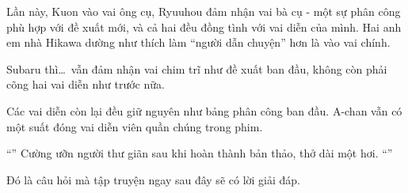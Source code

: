 \documentclass[../main.tex]{subfiles}
\begin{document}
Lần này, Kuon vào vai ông cụ, Ryuuhou đảm nhận vai bà cụ - một sự phân công phù hợp với đề xuất mới, và cả hai đều đồng tình với vai diễn của mình. Hai anh em nhà Hikawa dường như thích làm ``người dẫn chuyện'' hơn là vào vai chính.

Subaru thì\dots\ vẫn đảm nhận vai chim trĩ như đề xuất ban đầu, không còn phải cõng hai vai diễn như trước nữa.

Các vai diễn còn lại đều giữ nguyên như bảng phân công ban đầu. A-chan vẫn có một suất đóng vai diễn viên quần chúng trong phim.

``'' Cường ưỡn người thư giãn sau khi hoàn thành bản thảo, thở dài một hơi. ``''

Đó là câu hỏi mà tập truyện ngay sau đây sẽ có lời giải đáp.
\end{document}
